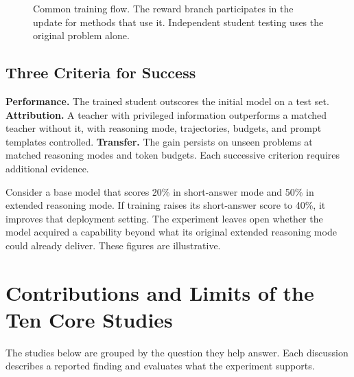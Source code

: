 \documentclass[11pt,a4paper]{article}
\begin{document}
\begin{figure}[htbp]
\centering
{}
\caption{Common training flow. The reward branch participates in the update for methods that use it. Independent student testing uses the original problem alone.}
\end{figure}

\subsection{Three Criteria for Success}
\textbf{Performance.} The trained student outscores the initial model on a test set.
\textbf{Attribution.} A teacher with privileged information outperforms a matched teacher without it, with reasoning mode, trajectories, budgets, and prompt templates controlled.
\textbf{Transfer.} The gain persists on unseen problems at matched reasoning modes and token budgets. Each successive criterion requires additional evidence.

Consider a base model that scores 20\% in short-answer mode and 50\% in extended reasoning mode. If training raises its short-answer score to 40\%, it improves that deployment setting. The experiment leaves open whether the model acquired a capability beyond what its original extended reasoning mode could already deliver. These figures are illustrative.

\section{Contributions and Limits of the Ten Core Studies}
The studies below are grouped by the question they help answer. Each discussion describes a reported finding and evaluates what the experiment supports.
\end{document}
